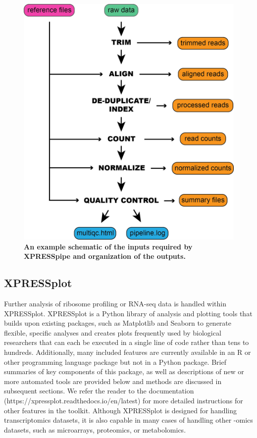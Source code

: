 \documentclass[10pt, oneside]{article}
\begin{document}
\begin{figure}
\centering
  \includegraphics[width=120mm]{figures/xpresspipe_overview.png}
  \caption{\textbf{An example schematic of the inputs required by XPRESSpipe and organization of the outputs.}}
  \label{fig:outputs}
\end{figure}


\subsection{XPRESSplot}
Further analysis of ribosome profiling or RNA-seq data is handled within XPRESSplot. XPRESSplot is a Python library of analysis and plotting tools that builds upon existing packages, such as Matplotlib \cite{matplotlib} and Seaborn \cite{seaborn} to generate flexible, specific analyses and creates plots frequently used by biological researchers that can each be executed in a single line of code rather than tens to hundreds. Additionally, many included features are currently available in an R or other programming language package but not in a Python package. Brief summaries of key components of this package, as well as descriptions of new or more automated tools are provided below and methods are discussed in subsequent sections. We refer the reader to the documentation (https://xpressplot.readthedocs.io/en/latest) for more detailed instructions for other features in the toolkit. Although XPRESSplot is designed for handling transcriptomics datasets, it is also capable in many cases of handling other -omics datasets, such as microarrays, proteomics, or metabolomics.
\end{document}
